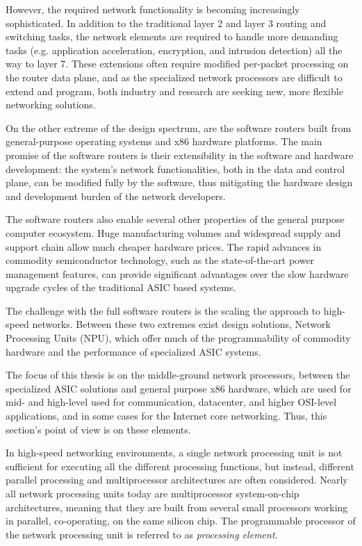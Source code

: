 However, the required network functionality is becoming increasingly sophisticated. In addition to the traditional layer 2 and layer 3 routing and switching tasks, the network elements are required to handle more demanding tasks (e.g. application acceleration, encryption, and intrusion detection) all the way to layer 7. These extensions often require modified per-packet processing on the router data plane, and as the specialized network processors are difficult to extend and program, both industry and research are seeking new, more flexible networking solutions.~\cite{Egi:2009:PP, Dobrescu:2009:REP}

On the other extreme of the design spectrum, are the software routers built from general-purpose operating systems and x86 hardware platforms. The main promise of the software routers is their extensibility in the software and hardware development: the system's network functionalities, both in the data and control plane, can be modified fully by the software, thus mitigating the hardware design and development burden of the network developers.~\cite{Dobrescu:2009:REP}

The software routers also enable several other properties of the general purpose computer ecosystem. Huge manufacturing volumes and widespread supply and support chain allow much cheaper hardware prices. The rapid advances in commodity semiconductor technology, such as the state-of-the-art power management features, can provide significant advantages over the slow hardware upgrade cycles of the traditional ASIC based systems.~\cite{Dobrescu:2009:REP}

The challenge with the full software routers is the scaling the approach to high-speed networks. Between these two extremes exist design solutions, Network Processing Units (NPU), which offer much of the programmability of commodity hardware and the performance of specialized ASIC systems.~\cite{Dobrescu:2009:REP}

The focus of this thesis is on the middle-ground network processors, between the specialized ASIC solutions and general purpose x86 hardware, which are used for mid- and high-level used for communication, datacenter, and higher OSI-level applications, and in some cases for the Internet core networking. Thus, this section's point of view is on these elements.

In high-speed networking environments, a single network processing unit is not sufficient for executing all the different processing functions, but instead, different parallel processing and multiprocessor architectures are often considered. Nearly all network processing units today are multiprocessor system-on-chip architectures, meaning that they are built from several small processors working in parallel, co-operating, on the same silicon chip. The programmable processor of the network processing unit is referred to as \emph{processing element}.~\cite{Giladi:2008:Network, Papaefstathiou:2005:Queue}

